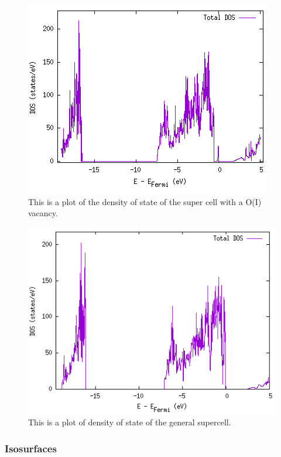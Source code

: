 \begin{figure}[H]
\includegraphics[width=\linewidth]{../fig/dosplot/total_dos_O_I_vacancy}\caption{This is a plot of the density of state of the super cell with a O(I) vacancy.}\label{fig:total_dos_vac}
\end{figure}

\begin{figure}[H]
\includegraphics[width=\linewidth]{../fig/dosplot/total_dos_supercell}\caption{This is a plot of density of state of the general supercell.}\label{fig:total_dos_supercell}
\end{figure}

\subsubsection{Isosurfaces}

